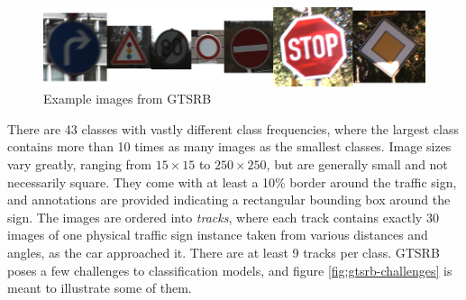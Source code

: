 \documentclass[11pt, a4paper]{article}
\begin{document}
\begin{figure}[h!tb]
	\centering
	\includegraphics[width=\textwidth]{images/gtsrb/overview.png}
	\caption{Example images from GTSRB}
	\label{fig:gtsrb-overview}
\end{figure}

There are 43 classes with vastly different class frequencies, where the largest class contains more than 10 times as many images as the smallest classes. Image sizes vary greatly, ranging from $15\times15$ to $250\times 250$, but are generally small and not necessarily square. They come with at least a 10\% border around the traffic sign, and annotations are provided indicating a rectangular bounding box around the sign. The images are ordered into \emph{tracks}, where each track contains exactly 30 images of one physical traffic sign instance taken from various distances and angles, as the car approached it. There are at least 9 tracks per class. GTSRB poses a few challenges to classification models, and figure \ref{fig:gtsrb-challenges} is meant to illustrate some of them.
\end{document}
